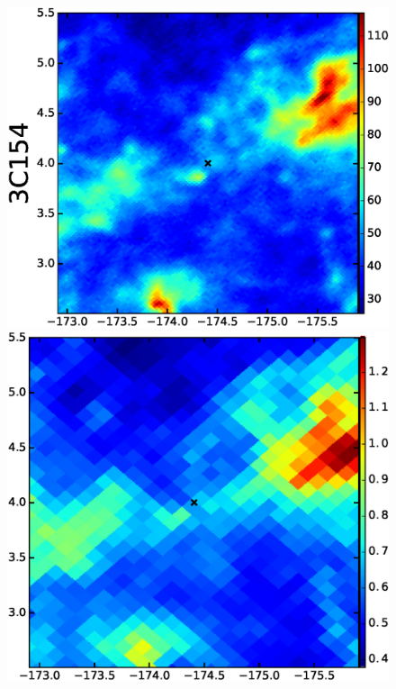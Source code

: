 \documentclass[preprint]{emulateapj}
\begin{document}
\begin{figure}
\includegraphics[scale=0.23]{fig/src_eg_apd0_r1c0.eps}
\includegraphics[scale=0.21]{fig/src_eg_apd0_r1c1.eps}

\end{figure}
\end{document}
